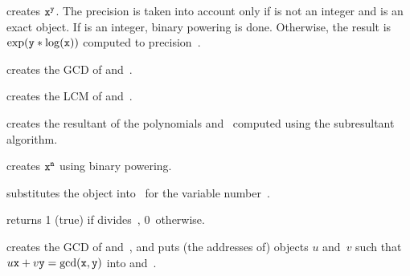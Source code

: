  creates ${\tt x}^{{\tt y}}$. The
precision  is taken into account only if  is not an integer
and  is an exact object. If  is an integer, binary powering
is done. Otherwise, the result is $\exp({\tt y}*\log({\tt x}))$ computed
to precision~.

 creates the GCD of  and~.

 creates the LCM of  and~.

 creates the resultant of the polynomials
 and~ computed using the subresultant algorithm.

 creates ${\tt x}^{{\tt n}}$ using
binary powering.

 substitutes the object 
into~ for the variable number~.

  returns 1 (true) if  divides~,
0~otherwise.

 creates the GCD of 
and~, and puts (the addresses of) objects $u$ and~$v$ such that
$u{\tt x}+v{\tt y}=\gcd({\tt x},{\tt y})$ into  and~.
\vfill\eject
